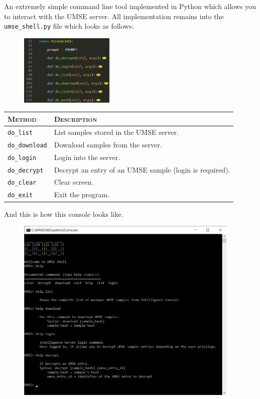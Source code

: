 An extremely simple command line tool implemented in Python which allows you
to interact with the UMSE server. All implementation remains into the
\texttt{umse\_shell.py} file which looks as follows:
\begin{figure}[h]
  \centering
  \includegraphics[width=0.4\textwidth]{./figures/UMSEShell}
\end{figure}

\begin{table}[h]
  \centering
  \begin{tabular}{|l|p{}|} \hline
    \textsc{Method} & \textsc{Description} \\ \hline
    \texttt{do\_list} &	List samples stored in the UMSE server. \\ \hline
    \texttt{do\_download} & Download samples from the server. \\ \hline
    \texttt{do\_login} & Login into the server. \\ \hline
    \texttt{do\_decrypt} & Decrypt an entry of an UMSE sample (login is
                           required). \\ \hline
    \texttt{do\_clear} & Clear screen. \\ \hline
    \texttt{do\_exit} & Exit the program. \\ \hline
  \end{tabular}
\end{table}

And this is how this console looks like.
\begin{figure}[h]
  \centering
  \includegraphics[width=0.95\textwidth]{./figures/UMSEConsole}
\end{figure}

